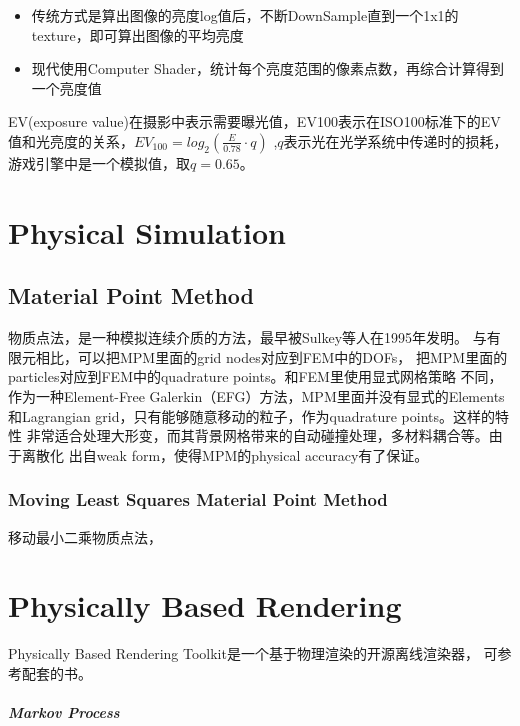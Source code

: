 \begin{itemize}
    \item {传统方式是算出图像的亮度log值后，不断DownSample直到一个1x1的texture，即可算出图像的平均亮度}
    \item {现代使用Computer Shader，统计每个亮度范围的像素点数，再综合计算得到一个亮度值}
\end{itemize}

EV(exposure value)在摄影中表示需要曝光值，EV100表示在ISO100标准下的EV值和光亮度的关系，$EV_{100}=log_{2}(\frac{E}{0.78} \cdot q)$
,$q$表示光在光学系统中传递时的损耗，游戏引擎中是一个模拟值，取$q=0.65$。

\chapter{Physical Simulation}

\section{Material Point Method}

物质点法，是一种模拟连续介质的方法，最早被Sulkey等人在1995年发明。
与有限元相比，可以把MPM里面的grid nodes对应到FEM中的DOFs，
把MPM里面的particles对应到FEM中的quadrature points。和FEM里使用显式网格策略
不同，作为一种Element-Free Galerkin（EFG）方法，MPM里面并没有显式的Elements
和Lagrangian grid，只有能够随意移动的粒子，作为quadrature points。这样的特性
非常适合处理大形变，而其背景网格带来的自动碰撞处理，多材料耦合等。由于离散化
出自weak form，使得MPM的physical accuracy有了保证。

\subsection{Moving Least Squares Material Point Method}

移动最小二乘物质点法，

\chapter{Physically Based Rendering}

Physically Based Rendering Toolkit是一个基于物理渲染的开源离线渲染器， 可参考配套的书\cite{PBR3ed}。



\paragraph{Markov Process}

